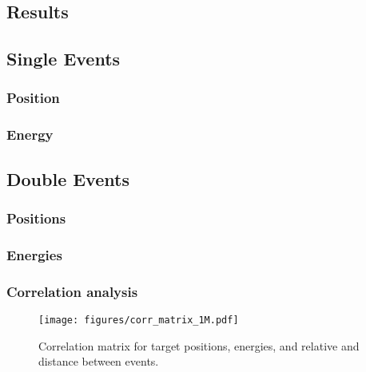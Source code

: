 \subsection{Results}
\subsection{Single Events}
\subsubsection{Position}
\subsubsection{Energy}
\subsection{Double Events}
\subsubsection{Positions}
\subsubsection{Energies}
\subsubsection{Correlation analysis}
\begin{figure}
    \texttt{[image: figures/corr\_matrix\_1M.pdf]}
    \caption{Correlation matrix for target positions, energies, and relative
    and distance between events.}
    \label{fig:corr-matrix-target}
\end{figure}
